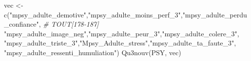 \documentclass[
]{article}
\newenvironment{Shaded}{\begin{snugshade}}{\end{snugshade}}
\newcommand{\CommentTok}[1]{\textcolor[rgb]{0.56,0.35,0.01}{\textit{#1}}}
\newcommand{\FunctionTok}[1]{\textcolor[rgb]{0.00,0.00,0.00}{#1}}
\newcommand{\NormalTok}[1]{#1}
\newcommand{\OtherTok}[1]{\textcolor[rgb]{0.56,0.35,0.01}{#1}}
\newcommand{\StringTok}[1]{\textcolor[rgb]{0.31,0.60,0.02}{#1}}
\begin{document}
\begin{Shaded}
\begin{Highlighting}[]
\NormalTok{vec }\OtherTok{\textless{}{-}} \FunctionTok{c}\NormalTok{(}\StringTok{"mpsy\_adulte\_demotive"}\NormalTok{,}\StringTok{"mpsy\_adulte\_moins\_perf\_3"}\NormalTok{,}\StringTok{"mpsy\_adulte\_perdu\_confiance"}\NormalTok{,  }\CommentTok{\# TOUT[178{-}187]}
    \StringTok{"mpsy\_adulte\_image\_neg"}\NormalTok{,}\StringTok{"mpsy\_adulte\_peur\_3"}\NormalTok{,}\StringTok{"mpsy\_adulte\_colere\_3"}\NormalTok{,}
    \StringTok{"mpsy\_adulte\_triste\_3"}\NormalTok{,}\StringTok{"Mpsy\_Adulte\_stress"}\NormalTok{,}\StringTok{"mpsy\_adulte\_ta\_faute\_3"}\NormalTok{,}
    \StringTok{"mpsy\_adulte\_ressenti\_humuliation"}\NormalTok{)}
\FunctionTok{Qu3nouv}\NormalTok{(PSY, vec)}
\end{Highlighting}
\end{Shaded}
\end{document}
